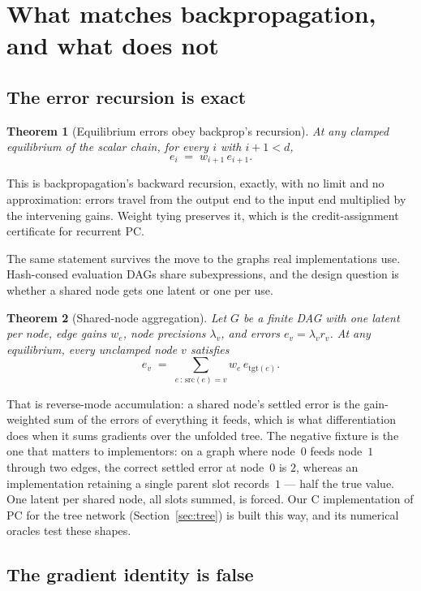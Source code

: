 \documentclass[11pt]{article}
\newtheorem{theorem}{Theorem}[section]
\begin{document}
\section{What matches backpropagation, and what does not}

\subsection{The error recursion is exact}

\begin{theorem}[Equilibrium errors obey backprop's recursion]\label{thm:errrec}
At any clamped equilibrium of the scalar chain, for every $i$ with $i+1 < d$,
\[
e_i \;=\; w_{i+1}\, e_{i+1}.
\]
\end{theorem}

This is backpropagation's backward recursion, exactly, with no limit and no
approximation: errors travel from the output end to the input end multiplied by the
intervening gains. Weight tying preserves it, which is the credit-assignment certificate
for recurrent PC.

The same statement survives the move to the graphs real implementations use. Hash-consed
evaluation DAGs share subexpressions, and the design question is whether a shared node
gets one latent or one per use.

\begin{theorem}[Shared-node aggregation]\label{thm:dagrec}
Let $G$ be a finite DAG with one latent per node, edge gains $w_e$, node precisions
$\lambda_v$, and errors $e_v = \lambda_v r_v$. At any equilibrium, every unclamped node
$v$ satisfies
\[
e_v \;=\; \sum_{e\,:\,\mathrm{src}(e) = v} w_e\, e_{\mathrm{tgt}(e)} .
\]
\end{theorem}

That is reverse-mode accumulation: a shared node's settled error is the gain-weighted
sum of the errors of everything it feeds, which is what differentiation does when it
sums gradients over the unfolded tree. The negative fixture is the one that matters to
implementors: on a graph where node~$0$ feeds node~$1$ through two edges, the correct
settled error at node~$0$ is $2$, whereas an implementation retaining a single parent
slot records~$1$ --- half the true value. One latent per shared node, all slots summed,
is forced. Our C implementation of PC for the tree network (Section~\ref{sec:tree}) is
built this way, and its numerical oracles test these shapes.

\subsection{The gradient identity is false}
\end{document}

